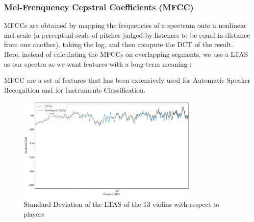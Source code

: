 \documentclass[letterpaper,11pt,leqno]{article}
\begin{document}
\subsubsection{Mel-Frenquency Cepstral Coefficients (MFCC)}{
	MFCCs are obtained by mapping the frequencies of a spectrum onto a nonlinear mel-scale (a perceptual scale of pitches judged by listeners to be equal in distance from one another), taking the log, and then compute the DCT of the result. Here, instead of calculating the MFCCs on overlapping segments, we use a LTAS as our spectra as we want features with a long-term meaning :

	\begin{figure}[!h]
	\end{figure}

	MFCC are a set of features that has been extensively used for Automatic Speaker Recognition and for Instruments Classification.

	\begin{figure}[!h]
		\includegraphics[width=0.8\textwidth]{../figures/ltcc.png}
		\caption{Standard Deviation of the LTAS of the 13 violins with respect to players}
	\end{figure}
}
\end{document}
